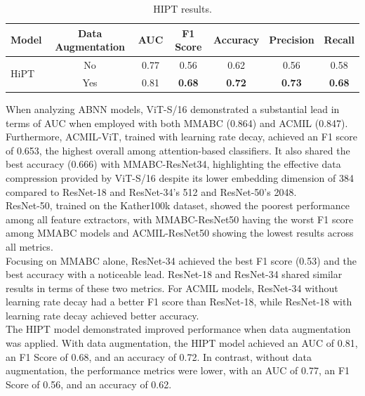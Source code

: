 \documentclass[
11pt, %
english, %
singlespacing, %
headsepline, %
]{project_structure}
\newcommand{\subpar}[1]{\paragraph*{#1}}
\begin{document}
\begin{table}[ht]
    \centering
    \begin{tabular}{l|c|ccccc}
        \toprule
        \textbf{Model} & \textbf{Data Augmentation} & \textbf{AUC} & \textbf{F1 Score} & \textbf{Accuracy} & \textbf{Precision} & \textbf{Recall} \\
        \midrule
        \multirow{2}{*}{HiPT} & No & 0.77 & 0.56 & 0.62 & 0.56 & 0.58 \\
                              & Yes & 0.81 & \textbf{0.68} & \textbf{0.72} & \textbf{0.73} & \textbf{0.68} \\
        \bottomrule
    \end{tabular}
    \caption{\acrshort{HIPT} results.}
    \label{tab:hipt_metrics}
\end{table}

\newpage


\noindent When analyzing ABNN models, ViT-S/16 demonstrated a substantial lead in terms of AUC when employed with both MMABC (0.864) and ACMIL (0.847). Furthermore, ACMIL-ViT, trained with learning rate decay, achieved an F1 score of 0.653, the highest overall among attention-based classifiers. It also shared the best accuracy (0.666) with MMABC-ResNet34, highlighting the effective data compression provided by ViT-S/16 despite its lower embedding dimension of 384 compared to ResNet-18 and ResNet-34's 512 and ResNet-50's 2048.\\

\noindent ResNet-50, trained on the Kather100k dataset, showed the poorest performance among all feature extractors, with MMABC-ResNet50 having the worst F1 score among MMABC models and ACMIL-ResNet50 showing the lowest results across all metrics.\\

\noindent Focusing on MMABC alone, ResNet-34 achieved the best F1 score (0.53) and the best accuracy with a noticeable lead. ResNet-18 and ResNet-34 shared similar results in terms of these two metrics. For ACMIL models, ResNet-34 without learning rate decay had a better F1 score than ResNet-18, while ResNet-18 with learning rate decay achieved better accuracy.\\

\noindent The HIPT model demonstrated improved performance when data augmentation was applied. With data augmentation, the HIPT model achieved an AUC of 0.81, an F1 Score of 0.68, and an accuracy of 0.72. In contrast, without data augmentation, the performance metrics were lower, with an AUC of 0.77, an F1 Score of 0.56, and an accuracy of 0.62.\\
\end{document}
